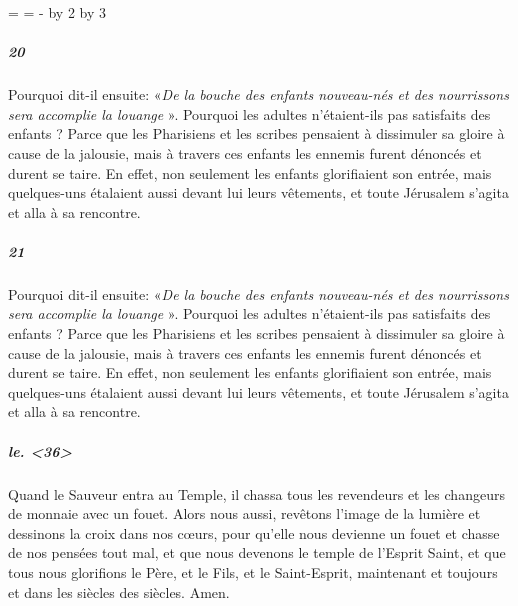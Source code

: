 \documentclass[a4paper]{article}
\newcommand{\largeurunecolonne}{%
  \newdimen\temp
  \temp=\hsize
  \hsize=\Lcolwidth
  \advance\hsize\Rcolwidth
  \advance\temp-\hsize
  \multiply\temp by 2
  \divide\temp by 3
  \advance\hsize\temp
  \doinsidelinehook{\hfill}
}
\begin{document}
    \resumenumbering
    \largeurunecolonne

 


            \pstart
\subparagraph{20}\sloppy
Pourquoi dit-il ensuite: «\textit{De la bouche des enfants nouveau-nés et des nourrissons sera accomplie la louange}%
». Pourquoi les adultes n'étaient-ils pas satisfaits des enfants ? Parce que les Pharisiens et les scribes pensaient à dissimuler sa gloire à cause de la jalousie, mais à travers ces enfants les ennemis furent dénoncés et durent se taire. En effet, non seulement les enfants glorifiaient son entrée, mais quelques-uns étalaient aussi devant lui leurs vêtements, et toute Jérusalem s'agita et alla à sa rencontre.  
        \pend
    \pausenumbering

\begin{pairs}
\begin{Leftside} 
    \resumenumbering
    
    \pstart
\subparagraph{21}\sloppy
Pourquoi dit-il ensuite: «\textit{De la bouche des enfants nouveau-nés et des nourrissons sera accomplie la louange}%
». Pourquoi les adultes n'étaient-ils pas satisfaits des enfants ? Parce que les Pharisiens et les scribes pensaient à dissimuler sa gloire à cause de la jalousie, mais à travers ces enfants les ennemis furent dénoncés et durent se taire. En effet, non seulement les enfants glorifiaient son entrée, mais quelques-uns étalaient aussi devant lui leurs vêtements, et toute Jérusalem s'agita et alla à sa rencontre.  
        \pend

        \endnumbering

\end{Leftside}

\begin{Rightside} 
    \resumenumbering
     
               
        \pstart
        \subparagraph{le. <36>}\sloppy
Quand le Sauveur entra au Temple, il chassa tous les revendeurs et les changeurs de monnaie avec un fouet. Alors nous aussi, revêtons l'image de la lumière et dessinons la croix dans nos cœurs, pour qu'elle nous devienne un fouet et chasse de nos pensées tout mal, et que nous devenons le temple de l'Esprit Saint, et que tous nous glorifions le Père, et le Fils, et le Saint-Esprit, maintenant et toujours et dans les siècles des siècles. Amen. 
        \pend
        
\endnumbering
\end{Rightside}
\Columns
\end{pairs}
\end{document}
